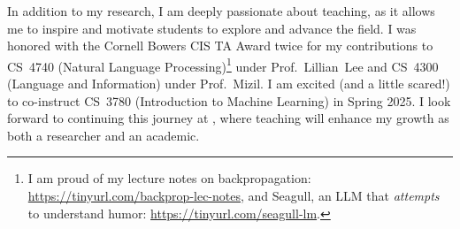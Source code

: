 In addition to my research, I am deeply passionate about teaching, as it allows me to inspire and motivate students to explore and advance the field.
%
I was honored with the Cornell Bowers CIS TA Award twice for my contributions to CS~4740 (Natural Language Processing)\footnote{I am proud of my lecture notes on backpropagation: \url{https://tinyurl.com/backprop-lec-notes}, and Seagull, an LLM that \textit{attempts} to understand humor: \url{https://tinyurl.com/seagull-lm}.} under Prof.~Lillian~Lee and CS~4300 (Language and Information) under Prof.~Mizil. 
%
I am excited (and a little scared!) to co-instruct CS~3780 (Introduction to Machine Learning) in Spring 2025.
%
I look forward to continuing this journey at \thecollegeabbr, where teaching will enhance my growth as both a researcher and an academic.
